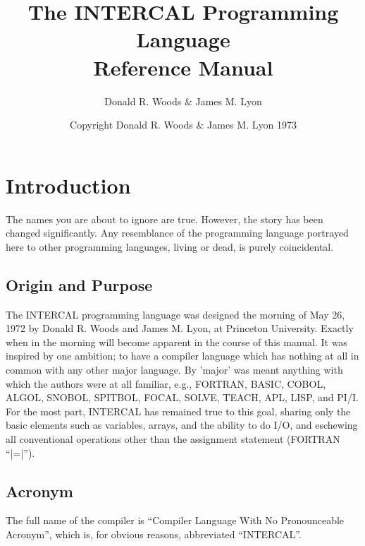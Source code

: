 
\title{                 The INTERCAL Programming Language \\
                                Reference Manual}
\author{                        Donald R. Woods \& James M. Lyon}
\date{                Copyright Donald R. Woods \& James M. Lyon 1973}



\maketitle
\thispagestyle{empty}
\newpage

\tableofcontents
\thispagestyle{empty}
\newpage
\setcounter{page}{1}

\section{Introduction}

The names you are about to ignore are true.  However, the story has been
changed significantly.  Any resemblance of the programming language
portrayed here to other programming languages, living or dead, is purely
coincidental.

\subsection{Origin and Purpose}

The INTERCAL programming language was designed the morning of May 26, 1972
by Donald R. Woods and James M. Lyon, at Princeton University.  Exactly
when in the morning will become apparent in the course of this manual.  It
was inspired by one ambition; to have a compiler language which has nothing
at all in common with any other major language.  By 'major' was meant
anything with which the authors were at all familiar, e.g., FORTRAN, BASIC,
COBOL, ALGOL, SNOBOL, SPITBOL, FOCAL, SOLVE, TEACH, APL, LISP, and PI/I.
For the most part, INTERCAL has remained true to this goal, sharing only
the basic elements such as variables, arrays, and the ability to do I/O,
and eschewing all conventional operations other than the assignment
statement (FORTRAN ``|=|'').

\subsection{Acronym}

The full name of the compiler is ``Compiler Language With No Pronounceable
Acronym'', which is, for obvious reasons, abbreviated ``INTERCAL''.

